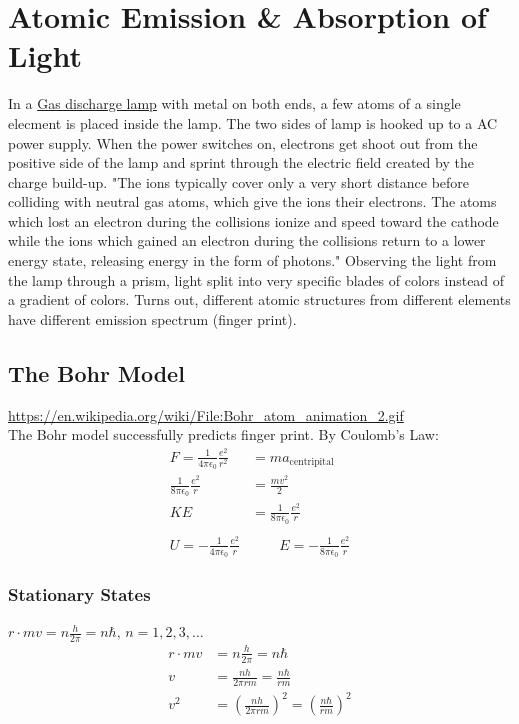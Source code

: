 \documentclass[11pt]{article}
\begin{document}
\section{Atomic Emission \& Absorption of Light}
\label{sec:org46a8381}
In a \href{https://en.wikipedia.org/wiki/Gas-discharge\_lamp}{Gas discharge lamp} with metal on both ends, a few atoms of a single elecment is placed inside the lamp. The two sides of lamp is hooked up to a AC power supply. When the power switches on, electrons get shoot out from the positive side of the lamp and sprint through the electric field created by the charge build-up. "The ions typically cover only a very short distance before colliding with neutral gas atoms, which give the ions their electrons. The atoms which lost an electron during the collisions ionize and speed toward the cathode while the ions which gained an electron during the collisions return to a lower energy state, releasing energy in the form of photons."
Observing the light from the lamp through a prism, light split into very specific blades of colors instead of a gradient of colors. Turns out, different atomic structures from different elements have different emission spectrum (finger print).
\subsection{The Bohr Model}
\label{sec:org15e43ab}
\url{https://en.wikipedia.org/wiki/File:Bohr\_atom\_animation\_2.gif} \\
The Bohr model successfully predicts finger print.
By Coulomb's Law:
\begin{align*}
F = \frac{1}{4 \pi \epsilon_0} \frac{e^2}{r^2} &= ma_{\mathrm{centripital}} \\
\frac{1}{8 \pi \epsilon_0} \frac{e^2}{r} &= \frac{mv^2}{2} \\
KE &= \frac{1}{8 \pi \epsilon_0} \frac{e^2}{r} \\ \\
U = - \frac{1}{4 \pi \epsilon_0} \frac{e^2}{r} &\qquad E = - \frac{1}{8 \pi \epsilon_0} \frac{e^2}{r}
\end{align*}
\subsubsection{Stationary States}
\label{sec:org9a4e517}
\(r \cdot mv = n \frac{h}{2 \pi} = n \hbar \text{, } n = 1, 2, 3, \dots\)
\begin{align*}
r \cdot mv &= n \frac{h}{2 \pi} = n \hbar \\
v &= \frac{nh}{2 \pi rm} = \frac{n \hbar}{rm} \\
v^2 &= (\frac{nh}{2 \pi rm})^2 = (\frac{n \hbar}{rm})^2 \\
\end{align*}
\end{document}

